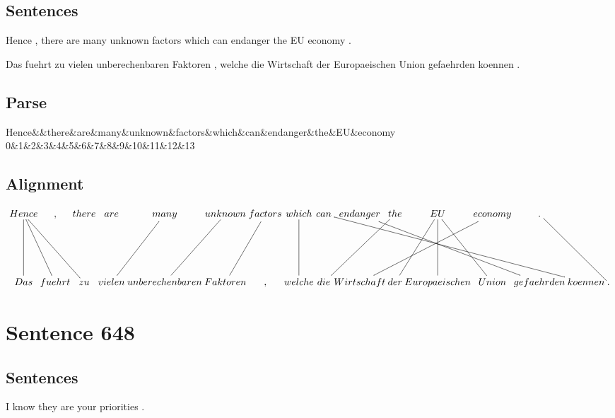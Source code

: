 \documentclass{report}
\begin{document}
\subsection*{Sentences}
Hence , there are many unknown factors which can endanger the EU economy .

\noindent Das fuehrt zu vielen unberechenbaren Faktoren , welche die Wirtschaft der Europaeischen Union gefaehrden koennen .



\subsection*{Parse}
\begin{dependency}[theme=simple]
\begin{deptext}[column sep=.5cm, row sep=.1ex]
Hence\&\&there\&are\&many\&unknown\&factors\&which\&can\&endanger\&the\&EU\&economy\\
0\&1\&2\&3\&4\&5\&6\&7\&8\&9\&10\&11\&12\&13\\
\end{deptext}
\end{dependency}


\subsection*{Alignment}
\scriptsize{
$
\xymatrix@C-2.3pc{
Hence \ar @{-} [ddr] \ar @{-} [dd] \ar @{-} [ddrr] & , & there & are & many \ar @{-} [ddl] & unknown \ar @{-} [ddl] & factors \ar @{-} [ddl] & which \ar @{-} [dd] & can \ar @{-} [ddrrrrrr] & endanger \ar @{-} [ddrrrr] & the \ar @{-} [ddll] & EU \ar @{-} [ddl] \ar @{-} [ddr] \ar @{-} [dd] & economy \ar @{-} [ddlll] & . \ar @{-} [ddrr]\\\\
Das & fuehrt & zu & vielen & unberechenbaren & Faktoren & , & welche & die & Wirtschaft & der & Europaeischen & Union & gefaehrden & koennen & .
}$}
\newpage\section*{Sentence 648}

\subsection*{Sentences}
I know they are your priorities .
\end{document}
